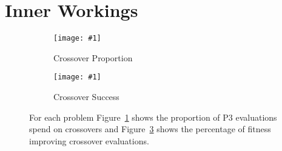 \documentclass[twoside]{article}
\newcommand{\includegraphicsfit}[1]
{\texttt{[image: \#1]}}
\begin{document}
\begin{comment}
It is important to note that hBOA and LTGA were tuned specifically
to find the global optimum and are not necessarily using the optimal population size for finding intermediate fitnesses. Consider
that for both reducing the population size would almost certainly improve their fitness for evaluation steps less than their population
size. To examine the effect of population size we tested LTGA using one tenth of the population size required for reliably finding the
global optimum, with the results given in Figure~\ref{fig-small-pop}.
Reducing the population size resulted in LTGA's initial fitness improvement
occurring earlier, as the first generation is completed much more quickly. On Deceptive Step Trap this means that
LTGA leaps ahead of P3 due to its ability to overcome the two bit fitness plateaus.
%
Across all tested problems using the smaller
population size reduced the quality of LTGA's first fitness plateau, likely due to missing required diversity to reach higher quality.
The second period of improvement also comes earlier and reaches a lower quality fitness. On Deceptive Step Trap 0
runs reach the global optimum, down from 100 successful for the full population size. On Nearest Neighbor NK this drops the number
of successful runs from 98 to 68. As a result we conclude that while reducing the population size of LTGA may improve its quality
at early points during optimization, doing so reduces the robustness of the final solution found. This is in contrast to P3
which balances high quality intermediate fitness without trading away eventual optimality.
\end{comment}

\section{Inner Workings}

\begin{figure}[t]
  \begin{centering}
    \begin{subfigure}{.5\textwidth}
      \begin{centering}
        \includegraphicsfit{cross}
      \end{centering}
      \caption{Crossover Proportion}
      \label{fig-cross}
    \end{subfigure}%
    \begin{subfigure}{.5\textwidth}
      \begin{centering}
        \includegraphicsfit{cross-success}
      \end{centering}
      \caption{Crossover Success}
      \label{fig-cross-success}
    \end{subfigure}
  \end{centering}
  \caption{For each problem Figure~\ref{fig-cross} shows the proportion of P3 evaluations spend on crossovers
           and Figure~\ref{fig-cross-success} shows the percentage of fitness improving crossover evaluations.}
\end{figure}
\end{document}
